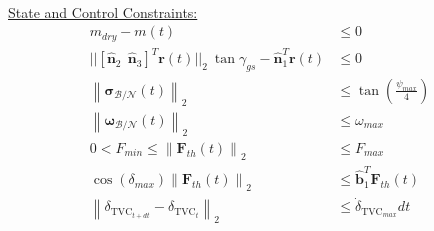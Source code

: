 \begin{mdframed}
\begin{align*}
\end{align*}
%
\underline{State and Control Constraints:}  
\begin{align*}
m_{dry} - m(t) & \leq 0 \\
|| [\hat{\bm{n}}_2 \ \ \hat{\bm{n}}_3 ]^T \mathbf{r}(t) \lvert\lvert_2 \ \tan{\gamma_{gs}}  - \hat{\bm{n}}_1^T \mathbf{r}(t) & \leq 0 \\
%
\left \lVert \boldsymbol{\sigma}_\mathcal{B/N} (t) \right \lVert_2 &\leq \tan \left( \frac{\psi_{max}}{4} \right) \\
%
\left \lVert \bm{\omega}_\mathcal{B/N}(t) \right \lVert_2 & \leq \omega_{max}\\
0 < F_{min} \leq \left \lVert \bm{F}_{th}(t) \right \lVert_2 &\leq F_{max} \\
\cos(\delta_{max}) \left \lVert \bm{F}_{th}(t) \right \lVert_2 &\leq \hat{\bm{b}}_1^T \bm{F}_{th}(t) \\
\left \lVert \delta_{\text{TVC}_{t+dt}} - \delta_{\text{TVC}_{t}} \right \lVert_2 & \leq \dot{\delta}_{\text{TVC}_{max}}dt
\end{align*}
\end{mdframed}
































